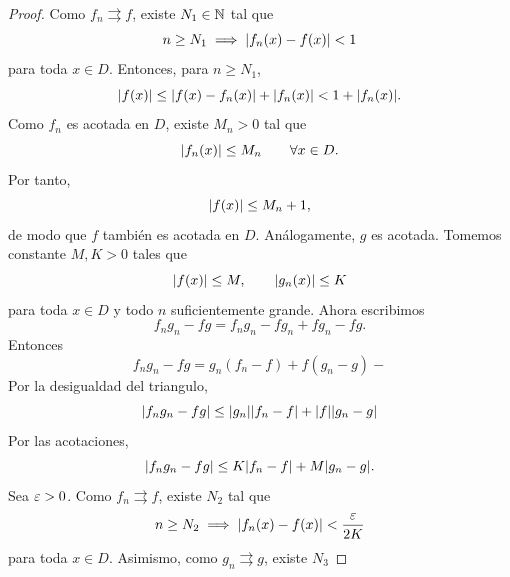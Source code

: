 \documentclass[12pt,a4paper]{article}
\begin{document}
    \begin{proof}
        Como $f_{n}\rightrightarrows f$, existe $N_{1}\in\mathbb{N}$ tal que
        \begin{equation*}
            n\geq N_{1}\implies \abs{f_{n}(x)-f(x)}<1
        \end{equation*}
        para toda $x\in D$. Entonces, para $n\geq N_{1}$,
        \begin{equation*}
            \abs{f(x)}\leq\abs{f(x)-f_{n}(x)}+\abs{f_{n}(x)}<1+\abs{f_{n}(x)}.
        \end{equation*}
        Como $f_{n}$ es acotada en $D$, existe $M_{n}\gt0$ tal que
        \begin{equation*}
            \abs{f_{n}(x)}\leq M_{n}\qquad\forall x\in D.
        \end{equation*}
        Por tanto,
        \begin{equation*}
            \abs{f(x)}\leq M_{n}+1,
        \end{equation*}
        de modo que $f$ también es acotada en $D$. Análogamente, $g$ es acotada. Tomemos
        constante $M,K\gt0$ tales que
        \begin{equation*}
            \abs{f(x)}\leq M,\qquad \abs{g_{n}(x)}\leq K
        \end{equation*}
        para toda $x\in D$ y todo $n$ suficientemente grande. Ahora escribimos
        \begin{equation*}
            f_{n}g_{n}-fg=f_{n}g_{n}-fg_{n}+fg_{n}-fg.
        \end{equation*}
        Entonces
        \begin{equation*}
            f_{n}g_{n}-fg=g_{n}(f_{n}-f)+f(g_{n}-g)-
        \end{equation*}
        Por la desigualdad del triangulo,
        \begin{equation*}
            \abs{f_{n}g_{n}-fg}\leq\abs{g_{n}}\abs{f_{n}-f}+\abs{f}\abs{g_{n}-g}
        \end{equation*}
        Por las acotaciones,
        \begin{equation*}
            \abs{f_{n}g_{n}-fg}\leq K\abs{f_{n}-f}+M\abs{g_{n}-g}.
        \end{equation*}
        Sea $\varepsilon>0$. Como $f_{n}\rightrightarrows f$, existe $N_{2}$ tal que
        \begin{equation*}
            n\geq N_{2}\implies\abs{f_{n}(x)-f(x)}<\frac{\varepsilon}{2K}
        \end{equation*}
        para toda $x\in D$. Asimismo, como $g_{n}\rightrightarrows g$, existe $N_{3}$

\end{proof}
\end{document}
